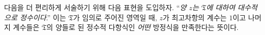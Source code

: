 
다음을 더 편리하게 서술하기 위해 다음 표현을 도입하자. ``\emph{양 $z$는 $\mathfrak T$에 대하여 대수적으로 정수이다}.'' 이는 $\mathfrak T$가 임의로 주어진 영역일 때, $z$가 최고차항의 계수는 $1$이고 나머지 계수들은 $\mathfrak T$의 양들로 된 정수적 다항식인 \emph{어떤} 방정식을 만족한다는 뜻이다.
